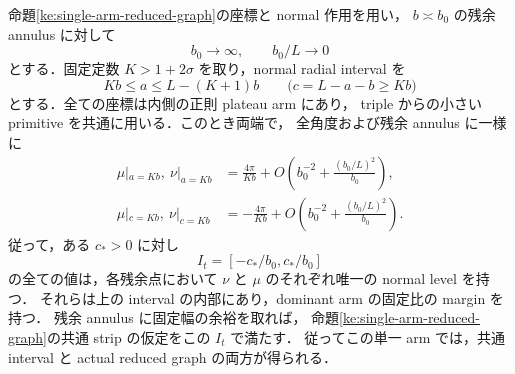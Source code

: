 \begin{proposition}
\label{ke:arm-common-moment-strip}
命題\ref{ke:single-arm-reduced-graph}の座標と normal 作用を用い，
$b\asymp b_0$ の残余 annulus に対して
\[
 b_0\longrightarrow\infty,\qquad b_0/L\longrightarrow0
\]
とする．固定定数 $K>1+2\sigma$ を取り，normal radial interval を
\[
 Kb\le a\le L-(K+1)b
 \qquad\bigl(c=L-a-b\ge Kb\bigr)
\]
とする．全ての座標は内側の正則 plateau arm にあり，
triple からの小さい primitive を共通に用いる．このとき両端で，
全角度および残余 annulus に一様に
\begin{align}
 \mu|_{a=Kb},\ \nu|_{a=Kb}
  &=\frac{4\pi}{Kb}
       +O\!\left(b_0^{-2}+\frac{(b_0/L)^2}{b_0}\right),
       \label{ke:eq:arm-positive-moment}\\
 \mu|_{c=Kb},\ \nu|_{c=Kb}
  &=-\frac{4\pi}{Kb}
       +O\!\left(b_0^{-2}+\frac{(b_0/L)^2}{b_0}\right).
       \label{ke:eq:arm-negative-moment}
\end{align}
従って，ある $c_*>0$ に対し
\[
 I_t=[-c_*/b_0,c_*/b_0]
\]
の全ての値は，各残余点において $\nu$ と $\mu$ のそれぞれ唯一の normal level を持つ．
それらは上の interval の内部にあり，dominant arm の固定比の margin を持つ．
残余 annulus に固定幅の余裕を取れば，
命題\ref{ke:single-arm-reduced-graph}の共通 strip の仮定をこの $I_t$ で満たす．
従ってこの単一 arm では，共通 interval と actual reduced graph の両方が得られる．
\end{proposition}

